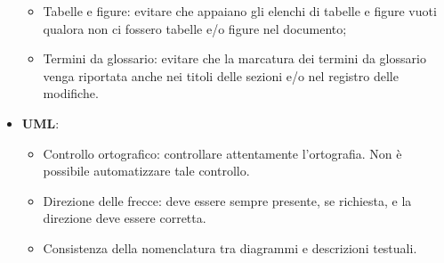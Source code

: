 \begin{itemize}
\begin{itemize}
	\item Tabelle e figure: evitare che appaiano gli elenchi di tabelle e figure vuoti qualora non ci fossero tabelle e/o figure nel documento;
	\item Termini da glossario: evitare che la marcatura dei termini da glossario venga riportata anche nei titoli delle sezioni e/o nel registro delle modifiche.
	\end{itemize}
\item \textbf{UML}:
	\begin{itemize}
	\item Controllo ortografico: controllare attentamente l'ortografia. Non è possibile automatizzare tale controllo.
	\item Direzione delle frecce: deve essere sempre presente, se richiesta, e la direzione deve essere corretta.
	\item Consistenza della nomenclatura tra diagrammi e descrizioni testuali.
	\end{itemize}
\end{itemize}